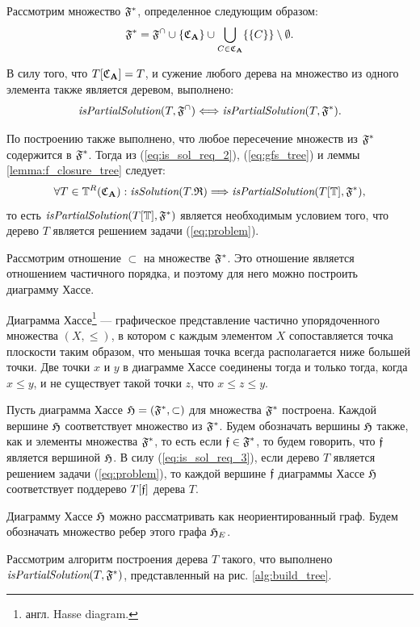 Рассмотрим множество $\mathfrak{F}^*$, определенное следующим образом:
\begin{equation}\label{eq:gfs_def}
\mathfrak{F}^* = \mathfrak{F}^{\cap} \cup \{\mathfrak{C}_{\mathbf{A}}\} \cup \bigcup_{C \in \mathfrak{C}_{\mathbf{A}}}\{\{C\}\} \setminus \emptyset \text{.}
\end{equation}

В силу того, что $T[\mathfrak{C}_{\mathbf{A}}] = T$, и сужение любого дерева на множество из одного элемента также является деревом, выполнено:
\begin{equation}\label{eq:gfs_tree}
\textit{isPartialSolution}(T, \mathfrak{F}^{\cap}) \Longleftrightarrow \textit{isPartialSolution}(T, \mathfrak{F}^*) \text{.}
\end{equation}

По построению также выполнено, что любое пересечение множеств из $\mathfrak{F}^*$ содержится в $\mathfrak{F}^*$. Тогда из (\ref{eq:is_sol_req_2}), (\ref{eq:gfs_tree}) и леммы \ref{lemma:f_closure_tree} следует:
\begin{equation}\label{eq:is_sol_req_3}
\forall T \in \mathbb{T}^R(\mathfrak{C}_{\mathbf{A}}): \textit{isSolution}(T. \mathfrak{R}) \Longrightarrow \textit{isPartialSolution}(T[\mathbb{T}], \mathfrak{F}^*) \text{,}
\end{equation}
то есть $\textit{isPartialSolution}(T[\mathbb{T}], \mathfrak{F}^*)$ является необходимым условием того, что дерево $T$ является решением задачи (\ref{eq:problem}).

Рассмотрим отношение $\subset$ на множестве $\mathfrak{F}^*$. Это отношение является отношением частичного порядка, и поэтому для него можно построить диаграмму Хассе.

Диаграмма Хассе\footnote{англ. Hasse diagram.} --- графическое представление частично упорядоченного множества $(X, \le)$, в котором с каждым элементом $X$ сопоставляется точка плоскости таким образом, что меньшая точка всегда располагается ниже большей точки. Две точки $x$ и $y$ в диаграмме Хассе соединены тогда и только тогда, когда $x \le y$, и не существует такой точки $z$, что $x \le z \le y$.

Пусть диаграмма Хассе $\mathfrak{H} = (\mathfrak{F}^*, \subset)$ для множества $\mathfrak{F}^*$ построена. Каждой вершине $\mathfrak{H}$ соответствует множество из $\mathfrak{F}^*$. Будем обозначать вершины $\mathfrak{H}$ также, как и элементы множества $\mathfrak{F}^*$, то есть если $\mathfrak{f} \in \mathfrak{F}^*$, то будем говорить, что $\mathfrak{f}$ является вершиной $\mathfrak{H}$. В силу (\ref{eq:is_sol_req_3}), если дерево $T$ является решением задачи (\ref{eq:problem}), то каждой вершине $\mathfrak{f}$ диаграммы Хассе $\mathfrak{H}$ соответствует поддерево $T[\mathfrak{f}]$ дерева $T$.

Диаграмму Хассе $\mathfrak{H}$ можно рассматривать как неориентированный граф. Будем обозначать множество ребер этого графа $\mathfrak{H}_E$.

Рассмотрим алгоритм построения дерева $T$ такого, что выполнено $\textit{isPartialSolution}(T, \mathfrak{F}^*)$, представленный на рис. \ref{alg:build_tree}.

